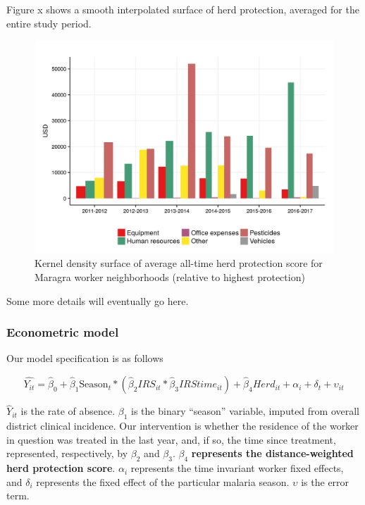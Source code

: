 \documentclass[]{article}
\begin{document}
Figure x shows a smooth interpolated surface of herd protection,
averaged for the entire study period.

\begin{figure}[!h]

{\centering \includegraphics{figures/unnamed-chunk-17-1} 

}

\caption{Kernel density surface of average all-time herd protection score for Maragra worker neighborhoods (relative to highest protection)}\label{fig:unnamed-chunk-17}
\end{figure}

Some more details will eventually go here.

\subsubsection{Econometric model}\label{econometric-model}

Our model specification is as follows

\[
\hat{Y_{it}} = \hat{\beta}_{0} +  \hat{\beta}_{1}\text{Season}_{t} * (\hat{\beta}_2{IRS_{it}}*\hat{\beta}_3{IRStime_{it}}) +  \hat{\beta}_4{Herd_{it}} +  \alpha_i + \delta_t + \upsilon_{it}
\]

\(\hat{Y}_{it}\) is the rate of absence. \(\beta_{1}\) is the binary
``season'' variable, imputed from overall district clinical incidence.
Our intervention is whether the residence of the worker in question was
treated in the last year, and, if so, the time since treatment,
represented, respectively, by \(\beta_{2}\) and \(\beta_{3}\).
\(\beta_{4}\) \textbf{represents the distance-weighted herd protection
score}. \(\alpha_i\) represents the time invariant worker fixed effects,
and \(\delta_i\) represents the fixed effect of the particular malaria
season. \(\upsilon\) is the error term.
\end{document}
